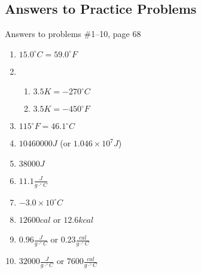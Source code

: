 \documentclass[11pt, oneside]{article}   	%
\begin{document}
\pagebreak
\subsection{Answers to Practice Problems}
Answers to problems \#1--10, page 68

\begin{enumerate}
\item $15.0^{\circ}C = 59.0^{\circ}F$
\item 
\begin{enumerate}
\item $3.5 K = -270^{\circ}C$
\item $3.5 K = -450 ^{\circ}F$
\end{enumerate}
\item $115^{\circ}F = 46.1^{\circ}C$
\item $10460000 J$ (or $1.046 \times 10^{7} J$)
\item $38000 J$
\item $11.1 \frac{J}{g \cdot ^{\circ}C}$
\item $-3.0 \times 10^{\circ}C$
\item $12600 cal $ or $12.6 kcal$
\item $0.96 \frac{J}{g \cdot ^{\circ}C}$ or $ 0.23 \frac{cal}{g \cdot ^{\circ}C}$
\item $32000 \frac{J}{g \cdot ^{\circ}C}$ or $7600 \frac{cal}{g \cdot ^{\circ}C}$
\end{enumerate}


\nocite{wile-chem-2}
{}

\end{document}
